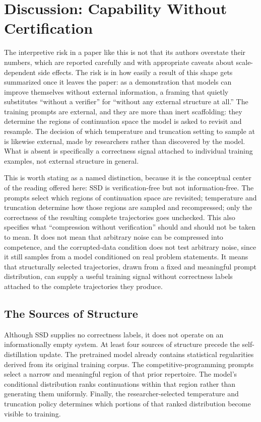 \documentclass[11pt]{article}
\begin{document}
\section{Discussion: Capability Without Certification}

The interpretive risk in a paper like this is not that its authors overstate their numbers, which are reported carefully and with appropriate caveats about scale-dependent side effects. The risk is in how easily a result of this shape gets summarized once it leaves the paper: as a demonstration that models can improve themselves without external information, a framing that quietly substitutes ``without a verifier'' for ``without any external structure at all.'' The training prompts are external, and they are more than inert scaffolding: they determine the regions of continuation space the model is asked to revisit and resample. The decision of which temperature and truncation setting to sample at is likewise external, made by researchers rather than discovered by the model. What is absent is specifically a correctness signal attached to individual training examples, not external structure in general.

This is worth stating as a named distinction, because it is the conceptual center of the reading offered here: SSD is verification-free but not information-free. The prompts select which regions of continuation space are revisited; temperature and truncation determine how those regions are sampled and recompressed; only the correctness of the resulting complete trajectories goes unchecked. This also specifies what ``compression without verification'' should and should not be taken to mean. It does not mean that arbitrary noise can be compressed into competence, and the corrupted-data condition does not test arbitrary noise, since it still samples from a model conditioned on real problem statements. It means that structurally selected trajectories, drawn from a fixed and meaningful prompt distribution, can supply a useful training signal without correctness labels attached to the complete trajectories they produce.

\subsection{The Sources of Structure}

Although SSD supplies no correctness labels, it does not operate on an informationally empty system. At least four sources of structure precede the self-distillation update. The pretrained model already contains statistical regularities derived from its original training corpus. The competitive-programming prompts select a narrow and meaningful region of that prior repertoire. The model's conditional distribution ranks continuations within that region rather than generating them uniformly. Finally, the researcher-selected temperature and truncation policy determines which portions of that ranked distribution become visible to training.
\end{document}
